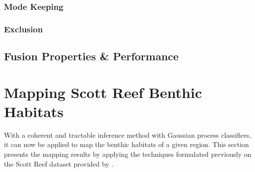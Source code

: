 			\subsubsection{Mode Keeping}
			\label{BenthicHabitatMapping:Classification:ProbabilityFusion:ModeKeeping}
				
			\subsubsection{Exclusion}
			\label{BenthicHabitatMapping:Classification:ProbabilityFusion:Exclusion}
			
		\subsection{Fusion Properties \& Performance}
		\label{BenthicHabitatMapping:Classification:Performance}
			
	\section{Mapping Scott Reef Benthic Habitats}
	\label{BenthicHabitatMapping:ScottReef}

		With a coherent and tractable inference method with Gaussian process classifiers, it can now be applied to map the benthic habitats of a given region. This section presents the mapping results by applying the techniques formulated previously on the Scott Reef dataset provided by \cite{IMOS}.  

